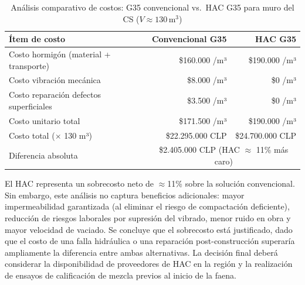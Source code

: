 \begin{table}[H]
  \centering
  \caption{Análisis comparativo de costos: G35 convencional vs.\ HAC G35 para muro del CS ($V \approx 130\,\text{m}^3$)}
  \label{tab:costos}
  \begin{tabular}{p{5.5cm} r r}
    \toprule
    Ítem de costo                          & Convencional G35  & HAC G35 \\
    \midrule
    Costo hormigón (material + transporte)          & \$160.000 /m³              & \$190.000 /m³    \\
    Costo vibración mecánica                        & \$8.000 /m³                & \$0 /m³          \\
    Costo reparación defectos superficiales         & \$3.500 /m³                & \$0 /m³          \\
    \midrule
    Costo unitario total                   & \$171.500 /m³     & \$190.000 /m³ \\
    Costo total ($\times$ 130 m³)          & \$22.295.000 CLP  & \$24.700.000 CLP \\
    \midrule
    Diferencia absoluta                    & \multicolumn{2}{c}{\$2.405.000 CLP (HAC $\approx$ 11\% más caro)} \\
    \bottomrule
  \end{tabular}
\end{table}

El HAC representa un sobrecosto neto de $\approx$11\% sobre la solución convencional. Sin embargo, este análisis no captura beneficios adicionales: mayor impermeabilidad garantizada (al eliminar el riesgo de compactación deficiente), reducción de riesgos laborales por supresión del vibrado, menor ruido en obra y mayor velocidad de vaciado. Se concluye que el sobrecosto está justificado, dado que el costo de una falla hidráulica o una reparación post-construcción superaría ampliamente la diferencia entre ambas alternativas. La decisión final deberá considerar la disponibilidad de proveedores de HAC en la región y la realización de ensayos de calificación de mezcla previos al inicio de la faena.

